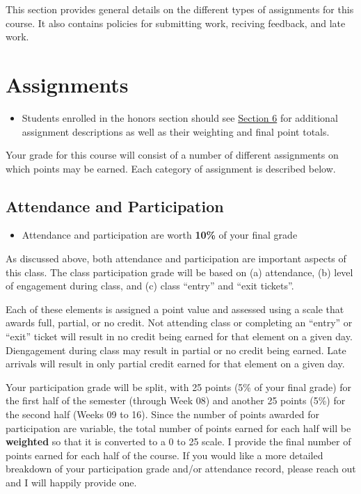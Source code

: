 \documentclass[]{book}
\newenvironment{rmdblock}[1]
  {\begin{shaded*}
  \begin{itemize}
  \renewcommand{\labelitemi}{
    \raisebox{-.7\height}[0pt][0pt]{
      {\setkeys{Gin}{width=3em,keepaspectratio}\texttt{[image: images/\#1]}}
    }
  }
  \item
  }
  {
  \end{itemize}
  \end{shaded*}
  }
\newenvironment{rmdtip}
  {\begin{rmdblock}{tip}}
  {\end{rmdblock}}
\newenvironment{rmdwarning}
  {\begin{rmdblock}{warning}}
  {\end{rmdblock}}
\theoremstyle{definition}
\theoremstyle{definition}
\theoremstyle{definition}
\theoremstyle{remark}
\begin{document}
This section provides general details on the different types of
assignments for this course. It also contains policies for submitting
work, reciving feedback, and late work.

\hypertarget{assignments}{%
\section{Assignments}\label{assignments}}

\begin{rmdwarning}
Students enrolled in the honors section should see
\href{/honors-overview.html}{Section 6} for additional assignment
descriptions as well as their weighting and final point totals.
\end{rmdwarning}

Your grade for this course will consist of a number of different
assignments on which points may be earned. Each category of assignment
is described below.

\hypertarget{attendance-and-participation-1}{%
\subsection{Attendance and
Participation}\label{attendance-and-participation-1}}

\begin{rmdtip}
Attendance and participation are worth \textbf{10\%} of your final grade
\end{rmdtip}

As discussed above, both attendance and participation are important
aspects of this class. The class participation grade will be based on
(a) attendance, (b) level of engagement during class, and (c) class
``entry'' and ``exit tickets''.

Each of these elements is assigned a point value and assessed using a
scale that awards full, partial, or no credit. Not attending class or
completing an ``entry'' or ``exit'' ticket will result in no credit
being earned for that element on a given day. Diengagement during class
may result in partial or no credit being earned. Late arrivals will
result in only partial credit earned for that element on a given day.

Your participation grade will be split, with 25 points (5\% of your
final grade) for the first half of the semester (through Week 08) and
another 25 points (5\%) for the second half (Weeks 09 to 16). Since the
number of points awarded for participation are variable, the total
number of points earned for each half will be \textbf{weighted} so that
it is converted to a 0 to 25 scale. I provide the final number of points
earned for each half of the course. If you would like a more detailed
breakdown of your participation grade and/or attendance record, please
reach out and I will happily provide one.
\end{document}

